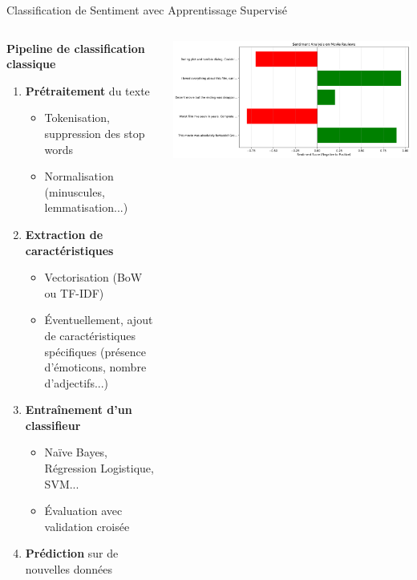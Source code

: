 \documentclass[aspectratio=169,11pt]{beamer}
\begin{document}
\begin{frame}{Classification de Sentiment avec Apprentissage Supervisé}
    \begin{columns}
        \begin{column}{0.55\textwidth}
            \textbf{Pipeline de classification classique}
            \begin{enumerate}
                \item \textbf{Prétraitement} du texte
                \begin{itemize}
                    \item Tokenisation, suppression des stop words
                    \item Normalisation (minuscules, lemmatisation...)
                \end{itemize}
                \item \textbf{Extraction de caractéristiques}
                \begin{itemize}
                    \item Vectorisation (BoW ou TF-IDF)
                    \item Éventuellement, ajout de caractéristiques spécifiques (présence d'émoticons, nombre d'adjectifs...)
                \end{itemize}
                \item \textbf{Entraînement d'un classifieur}
                \begin{itemize}
                    \item Naïve Bayes, Régression Logistique, SVM...
                    \item Évaluation avec validation croisée
                \end{itemize}
                \item \textbf{Prédiction} sur de nouvelles données
            \end{enumerate}
        \end{column}
        \begin{column}{0.45\textwidth}
            \includegraphics[width=\textwidth]{images/generated/sentiment_analysis.png}

\end{column}
\end{columns}
\end{frame}
\end{document}
